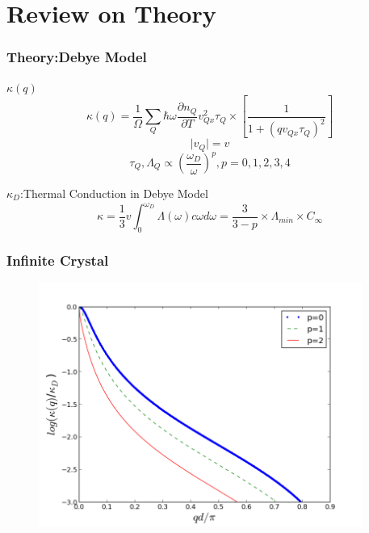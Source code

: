 \documentclass{beamer}
\begin{document}
\section{Review on Theory}
\begin{frame}
\frametitle{Theory:Debye Model}
\begin{block}{$\kappa(q)$}
\begin{equation*}
\kappa(q)=\frac{1}{\Omega}\sum\limits_{Q}\hbar\omega\frac{\partial n_Q}{\partial T}v_{Qx}^2\tau_Q\times[\frac{1}{1+(qv_{Qx}\tau_Q)^2}]
\end{equation*}
\begin{equation*}
\vert v_Q\vert=v
\end{equation*}
\begin{equation*}
\tau_Q,\Lambda_Q\varpropto \left(\frac{\omega_{D}}{\omega}\right)^p ,p=0,1,2,3,4
\end{equation*}
\end{block}

\begin{block}{$\kappa_D$:Thermal Conduction in Debye Model}
\begin{equation*}
\kappa =\frac{1}{3}v\int_0^{\omega_D} {\Lambda}(\omega)c{\omega}d{\omega}=\frac{3}{3-p}\times \Lambda_{min}\times{C}_{\infty}
\end{equation*}
\end{block}
\end{frame}
\begin{frame}
\frametitle{Infinite Crystal}
\begin{figure}
    \centering
    \includegraphics[height=8cm]{DebyeIn.png}
\end{figure}
\end{frame}
\end{document}
